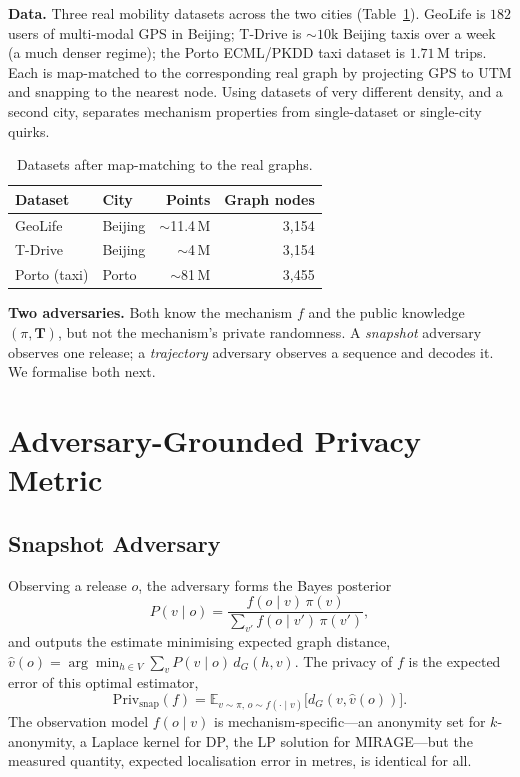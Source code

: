 \documentclass[10pt,journal,compsoc]{IEEEtran}
\newcommand{\dG}{d_{G}}
\begin{document}
\textbf{Data.} Three real mobility datasets across the two cities
(Table~\ref{tab:data}). GeoLife \cite{zheng2009,zheng2008} is $182$ users of
multi-modal GPS in Beijing; T-Drive is $\sim$$10$k Beijing taxis over a week (a
much denser regime); the Porto ECML/PKDD taxi dataset is $1.71$\,M trips. Each is
map-matched to the corresponding real graph by projecting GPS to UTM and snapping
to the nearest node. Using datasets of very different density, and a second city,
separates mechanism properties from single-dataset or single-city quirks.

\begin{table}[t]\centering
\caption{Datasets after map-matching to the real graphs.}
\label{tab:data}
\begin{tabular}{llrr}
\toprule
Dataset & City & Points & Graph nodes \\
\midrule
GeoLife & Beijing & $\sim$11.4\,M & 3{,}154 \\
T-Drive & Beijing & $\sim$4\,M & 3{,}154 \\
Porto (taxi) & Porto & $\sim$81\,M & 3{,}455 \\
\bottomrule
\end{tabular}
\end{table}

\textbf{Two adversaries.} Both know the mechanism $f$ and the public knowledge
$(\pi,\mathbf{T})$, but not the mechanism's private randomness. A \emph{snapshot}
adversary observes one release; a \emph{trajectory} adversary observes a sequence
and decodes it. We formalise both next.

\section{Adversary-Grounded Privacy Metric}
\label{sec:adversary}
\subsection{Snapshot Adversary}
Observing a release $o$, the adversary forms the Bayes posterior
\begin{equation}
P(v\mid o)=\frac{f(o\mid v)\,\pi(v)}{\sum_{v'} f(o\mid v')\,\pi(v')},
\end{equation}
and outputs the estimate minimising expected graph distance,
$\hat v(o)=\arg\min_{h\in V}\sum_v P(v\mid o)\,\dG(h,v)$. The privacy of $f$ is the
expected error of this optimal estimator,
\begin{equation}
\mathrm{Priv}_{\mathrm{snap}}(f)=\mathbb{E}_{v\sim\pi,\,o\sim f(\cdot\mid v)}\big[\dG(v,\hat v(o))\big].
\label{eq:snapprivacy}
\end{equation}
The observation model $f(o\mid v)$ is mechanism-specific---an anonymity set for
$k$-anonymity, a Laplace kernel for DP, the LP solution for MIRAGE---but the
measured quantity, expected localisation error in metres, is identical for all.
\end{document}
